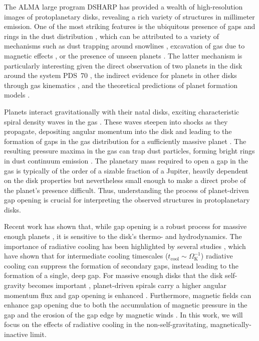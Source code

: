 \documentclass[fleqn,usenatbib,useAMS]{mnras}
\newcommand{\OmegaK}{\Omega_\mathrm{K}}
\newcommand{\tcool}{t_\mathrm{cool}}
\begin{document}
The ALMA large program DSHARP \citep{andrews-etal-2018} has provided a wealth of high-resolution images of protoplanetary disks, revealing a rich variety of structures in millimeter emission. One of the most striking features is the ubiquitous presence of gaps and rings in the dust distribution \citep{huang-etal-2018}, which can be attributed to a variety of mechanisms such as dust trapping around snowlines \citep{owen-2020}, excavation of gas due to magnetic effects \citep{bethune-etal-2017,riols-etal-2020}, or the presence of unseen planets \citep[e.g.,][]{zhang-etal-2018}. The latter mechanism is particularly interesting given the direct observation of two planets in the disk around the system PDS~70 \citep{keppler-etal-2018,haffert-etal-2019}, the indirect evidence for planets in other disks through gas kinematics \citep[e.g.,][]{teague-etal-2018}, and the theoretical predictions of planet formation models \citep[e.g.,][]{zhang-etal-2018,bae-etal-2019}.

Planets interact gravitationally with their natal disks, exciting characteristic spiral density waves in the gas \citep{goldreich-tremaine-1979,ogilvie-lubow-2002}. These waves steepen into shocks as they propagate, depositing angular momentum into the disk and leading to the formation of gaps in the gas distribution for a sufficiently massive planet \citep{rafikov-2002}. The resulting pressure maxima in the gas can trap dust particles, forming bright rings in dust continuum emission \citep{pinilla-etal-2012}. The planetary mass required to open a gap in the gas  \citep[``thermal mass'', see][]{rafikov-2002} is typically of the order of a sizable fraction of a Jupiter, heavily dependent on the disk properties \citep{crida-etal-2006} but nevertheless small enough to make a direct probe of the planet's presence difficult. Thus, understanding the process of planet-driven gap opening is crucial for interpreting the observed structures in protoplanetary disks.

Recent work has shown that, while gap opening is a robust process for massive enough planets \citep[e.g.,][]{rafikov-2002,crida-etal-2006}, it is sensitive to the disk's thermo- and hydrodynamics. The importance of radiative cooling has been highlighted by several studies \citep{miranda-rafikov-2019,miranda-rafikov-2020a,miranda-rafikov-2020b,ziampras-etal-2020b,ziampras-etal-2023a,zhang-zhu-2020,zhang-etal-2024}, which have shown that for intermediate cooling timescales ($\tcool\sim\OmegaK^{-1}$) radiative cooling can suppress the formation of secondary gaps, instead leading to the formation of a single, deep gap. For massive enough disks that the disk self-gravity becomes important \citep[$Q\gtrsim2$, see][]{toomre-1964}, planet-driven spirals carry a higher angular momentum flux and gap opening is enhanced \citep{zhang-zhu-2020}. Furthermore, magnetic fields can enhance gap opening due to both the accumulation of magnetic pressure in the gap and the erosion of the gap edge by magnetic winds \citep[e.g.,][]{wafflard-fernandez-lesur-2023,aoyama-bai-2023}. In this work, we will focus on the effects of radiative cooling in the non-self-gravitating, magnetically-inactive limit.
\end{document}
